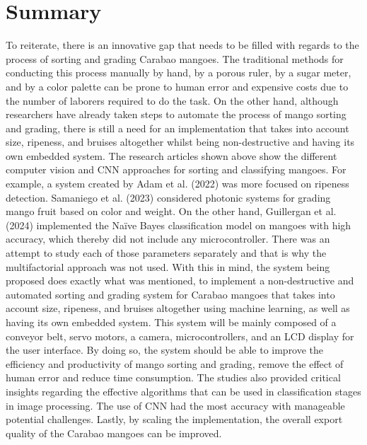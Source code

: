 \section{Summary}
To reiterate, there is an innovative gap that needs to be filled with regards to the process
of sorting and grading Carabao mangoes. The traditional methods for conducting this
process manually by hand, by a porous ruler, by a sugar meter, and by a color palette can
be prone to human error and expensive costs due to the number of laborers required to
do the task. On the other hand, although researchers have already taken steps to
automate the process of mango sorting and grading, there is still a need for an
implementation that takes into account size, ripeness, and bruises altogether whilst being
non-destructive and having its own embedded system. The research articles shown
above show the different computer vision and CNN approaches for sorting and
classifying mangoes. For example, a system created by Adam et al. (2022) was more
focused on ripeness detection. Samaniego et al. (2023) considered photonic systems for
grading mango fruit based on color and weight. On the other hand, Guillergan et al.
(2024) implemented the Naïve Bayes classification model on mangoes with high
accuracy, which thereby did not include any microcontroller. There was an attempt to
study each of those parameters separately and that is why the multifactorial approach
was not used. With this in mind, the system being proposed does exactly what was
mentioned, to implement a non-destructive and automated sorting and grading system
for Carabao mangoes that takes into account size, ripeness, and bruises altogether using
machine learning, as well as having its own embedded system. This system will be
mainly composed of a conveyor belt, servo motors, a camera, microcontrollers, and an
LCD display for the user interface. By doing so, the system should be able to improve
the efficiency and productivity of mango sorting and grading, remove the effect of
human error and reduce time consumption. The studies also provided critical insights
regarding the effective algorithms that can be used in classification stages in image
processing. The use of CNN had the most accuracy with manageable potential
challenges. Lastly, by scaling the implementation, the overall export quality of the
Carabao mangoes can be improved.




